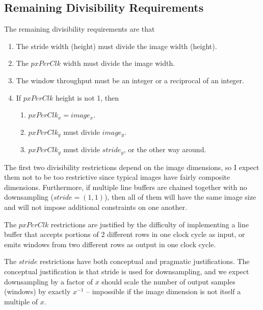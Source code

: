 \documentclass[12pt]{article}
\begin{document}
\subsection{Remaining Divisibility Requirements}

The remaining divisibility requirements are that
\begin{enumerate}
  \item The stride width (height) must divide the image width (height).
  \item The $pxPerClk$ width must divide the image width.
  \item The window throughput must be an integer or a reciprocal of an integer.
  \item If $pxPerClk$ height is not 1, then
  \begin{enumerate}
    \item $pxPerClk_x = image_x$.
    \item $pxPerClk_y$ must divide $image_y$.
    \item $pxPerClk_y$ must divide $stride_y$, or the other way around.
  \end{enumerate}
\end{enumerate}

The first two divisibility restrictions depend on the image
dimensions, so I expect them not to be too restrictive since typical
images have fairly composite dimensions. Furthermore, if multiple line
buffers are chained together with no downsampling ($stride = (1,1)$),
then all of them will have the same image size and will not impose
additional constraints on one another.

The $pxPerClk$ restrictions are justified by the difficulty of
implementing a line buffer that accepts portions of 2 different rows
in one clock cycle as input, or emits windows from two different rows
as output in one clock cycle.

The $stride$ restrictions have both conceptual and pragmatic
justifications. The conceptual justification is that stride is used
for downsampling, and we expect downsampling by a factor of $x$ should
scale the number of output samples (windows) by exactly $x^{-1}$ --
impossible if the image dimension is not itself a multiple of $x$.
\end{document}
